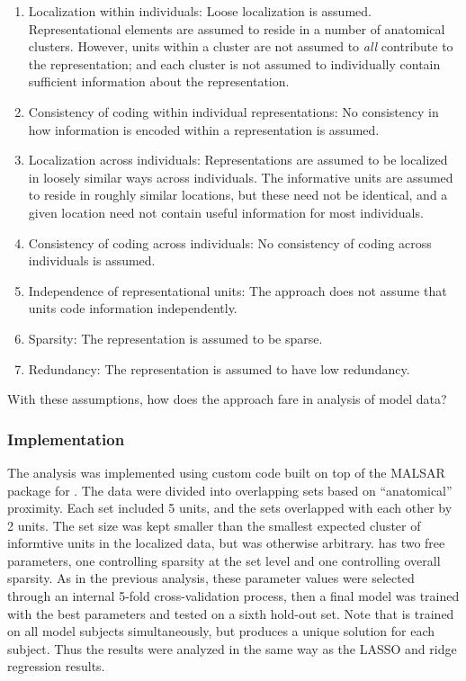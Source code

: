 \begin{enumerate}
\item Localization within individuals: Loose localization is assumed. Representational elements are assumed to reside in a number of anatomical clusters. However, units within a cluster are not assumed to {\em all} contribute to the representation; and each cluster is not assumed to individually contain sufficient information about the representation.

\item Consistency of coding within individual representations: No consistency in how information is encoded within a representation is assumed.

\item Localization across individuals: Representations are assumed to be localized in loosely similar ways across individuals. The informative units are assumed to reside in roughly similar locations, but these need not be identical, and a given location need not contain useful information for most individuals.

\item Consistency of coding across individuals: No consistency of coding across individuals is assumed.

\item Independence of representational units: The approach does not assume that units code information independently.

\item Sparsity: The representation is assumed to be sparse.

\item Redundancy: The representation is assumed to have low redundancy.
\end{enumerate}

With these assumptions, how does the approach fare in analysis of model data?

\subsubsection{Implementation} 
The \soslasso analysis was implemented using custom code built on top of the MALSAR package\cite{malsar} for \matlab. The data were divided into overlapping sets based on ``anatomical'' proximity. Each set included 5 units, and the sets overlapped with each other by 2 units. The set size was kept smaller than the smallest expected cluster of informtive units in the localized data, but was otherwise arbitrary. \soslasso has two free parameters, one controlling sparsity at the set level and one controlling overall sparsity. As in the previous analysis, these parameter values  were selected through an internal 5-fold cross-validation process, then a final model was trained with the best parameters and tested on a sixth hold-out set. Note that \soslasso is trained on all model subjects simultaneously, but produces a unique solution for each subject. Thus the results were analyzed in the same way as the LASSO and ridge regression results.

